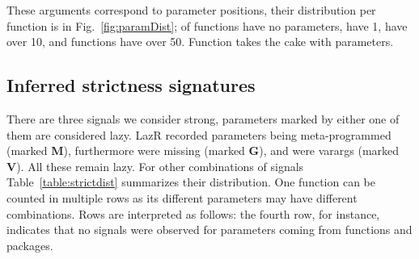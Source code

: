 \documentclass[review,screen,acmsmall]{acmart}
\newcommand{\lazr}{{\sf LazR}\xspace}
\begin{document}
These arguments correspond to \TotalParameterCount parameter positions, their
distribution per function is in Fig.~\ref{fig:paramDist}; \ZeroArityFunctionPerc
of functions have no parameters, \OneArityFunctionPerc have 1,
\TenArityFunctionPerc have over 10, and \FiftyArityFunctionCount functions have
over 50. Function \texttt{\MaxArityFunctionName} takes the cake with
\texttt{\MaxArityFunctionParamCount} parameters.

\subsection{Inferred strictness signatures}\label{sec:results}

There are three signals we consider strong, parameters marked by either one of
them are considered lazy. \lazr recorded \MetaCountParametersTotal parameters
being meta-programmed (marked \textbf{M}), furthermore
\MissingAlwaysCountParameters were missing (marked \textbf{G}), and
\VarargParameterCount were varargs (marked \textbf{V}). All these remain lazy.
For other combinations of signals Table~\ref{table:strictdist} summarizes their
distribution. One function can be counted in multiple rows as its different
parameters may have different combinations. Rows are interpreted as follows: the
fourth row, for instance, indicates that no signals were observed for
\TotalStrictParamCount parameters coming from \TotalStrictFunCount functions and
\TotalStrictPackCount packages.
\end{document}

